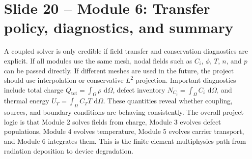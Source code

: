 \documentclass[11pt]{article}
\newcommand{\dd}{\,\mathrm{d}}
\begin{document}
\section*{Slide 20 -- Module 6: Transfer policy, diagnostics, and summary}
\begin{scriptbox}
A coupled solver is only credible if field transfer and conservation diagnostics are explicit. If all modules use the same mesh, nodal fields such as \(C_i\), \(\phi\), \(T\), \(n\), and \(p\) can be passed directly. If different meshes are used in the future, the project should use interpolation or conservative \(L^2\) projection. Important diagnostics include total charge \(Q_{\mathrm{tot}}=\int_\Omega\rho\,\dd\Omega\), defect inventory \(N_{C_i}=\int_\Omega C_i\,\dd\Omega\), and thermal energy \(U_T=\int_\Omega C_TT\,\dd\Omega\). These quantities reveal whether coupling, sources, and boundary conditions are behaving consistently. The overall project logic is that Module 2 solves fields from charge, Module 3 evolves defect populations, Module 4 evolves temperature, Module 5 evolves carrier transport, and Module 6 integrates them. This is the finite-element multiphysics path from radiation deposition to device degradation.
\end{scriptbox}
\end{document}
